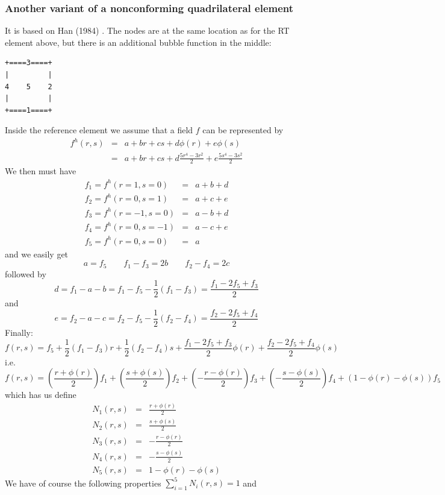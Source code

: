 \subsubsection*{Another variant of a nonconforming quadrilateral element}

It is based on Han (1984) \cite{han84}.
The nodes are at the same location as for the RT element above, but 
there is an additional bubble function in the middle:
\begin{verbatim}
+====3====+
|         |
4    5    2
|         |
+====1====+
\end{verbatim}
Inside the reference element we assume that a field $f$
can be represented by 
\begin{eqnarray}
f^h(r,s) 
&=& a+ br +cs +d \phi(r) +e \phi(s) \\
&=& a+ br +cs +d \frac{5r^4-3r^2}{2}+e \frac{5s^4-3s^2}{2}
\end{eqnarray}
We then must have 
\begin{eqnarray}
f_1 = f^h(r=1,s=0) &=& a+ b +d \\
f_2 = f^h(r=0,s=1) &=& a+ c +e \\
f_3 = f^h(r=-1,s=0) &=& a- b +d \\
f_4 = f^h(r=0,s=-1) &=& a -c +e\\
f_5 = f^h(r=0,s=0) &=& a 
\end{eqnarray}
and we easily get 
\[
a = f_5 
\qquad
f_1-f_3 = 2b
\qquad 
f_2-f_4 = 2c
\]
followed by
\[
d=f_1-a-b = f_1 - f_5 - \frac{1}{2}(f_1-f_3) = \frac{f_1-2f_5+f_3}{2}
\]
and 
\[
e = f_2-a-c = f_2 - f_5 -  \frac{1}{2}(f_2-f_4) = \frac{f_2 -2f_5+f_4 }{2}
\]
Finally:
\[
f(r,s) = 
f_5 +
\frac{1}{2}(f_1-f_3) r+
\frac{1}{2}(f_2-f_4) s+
\frac{f_1-2f_5+f_3}{2} \phi(r)+
\frac{f_2 -2f_5+f_4 }{2} \phi(s)
\]
i.e.
\[
f(r,s) = 
\left(\frac{r + \phi(r)}{2} \right)f_1 +
\left(\frac{s+\phi(s)}{2} \right)f_2 +
\left(-\frac{r-\phi(r)}{2} \right)f_3 +
\left(-\frac{s - \phi(s)}{2} \right)f_4 +
\left(1-\phi(r)-\phi(s) \right)f_5 
\]
which has us define 
\begin{eqnarray}
N_1(r,s) &=& \frac{r + \phi(r)}{2} \\
N_2(r,s) &=& \frac{s+\phi(s)}{2}\\
N_3(r,s) &=& -\frac{r-\phi(r)}{2} \\
N_4(r,s) &=& -\frac{s - \phi(s)}{2}\\
N_5(r,s) &=& 1-\phi(r)-\phi(s)
\end{eqnarray}
We have of course the following properties $\sum_{i=1}^5 N_i(r,s) = 1$ and 
